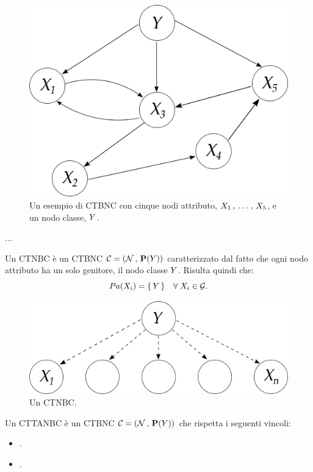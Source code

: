 \begin{figure}
\centering
\includegraphics[width=0.9\columnwidth]{immagini/ctbnc}
\caption[Un esempio di \acs{CTBNC}]{Un esempio di \acl{CTBNC} con cinque nodi attributo, $\mathnormal{X}_1\,,\,\dotsc\,,\,\mathnormal{X}_5$, e un nodo classe, $\mathnormal{Y}$.}
\label{fig:ctbnc-example}
\end{figure}

...

\begin{definizione}\label{defn:ctnbc}
Un \acf{CTNBC} è un \acl{CTBNC} $\mathcal{C}=(\mathcal{N}\,,\,\mathbf{P}(\mathnormal{Y}))$ caratterizzato dal fatto che ogni nodo attributo ha un solo genitore, il nodo classe $\mathnormal{Y}$. Risulta quindi che:
\[
Pa(\mathnormal{X}_i)=\{\,\mathnormal{Y}\,\} \quad \forall \; \mathnormal{X}_i \in \mathcal{G}\text{.}
\]
\end{definizione}

\begin{figure}
\centering
\includegraphics[width=0.9\columnwidth]{immagini/ctnb}
\caption[Un \acs{CTNBC}]{Un \acl{CTNBC}.}
\label{fig:ctnb}
\end{figure}

\begin{definizione}\label{defn:cttanbc}
Un \acf{CTTANBC} è un \acl{CTBNC} $\mathcal{C}=(\mathcal{N}\,,\,\mathbf{P}(\mathnormal{Y}))$ che rispetta i seguenti vincoli:
\begin{itemize}
    \item .
    \item .
\end{itemize}
\end{definizione}

